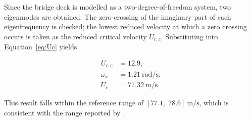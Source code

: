 \documentclass[../main]{subfiles}
\begin{document}
Since the bridge deck is modelled as a two-degree-of-freedom system, two
eigenmodes are obtained. The zero-crossing of the imaginary part of each
eigenfrequency is checked; the lowest reduced velocity at which a zero crossing
occurs is taken as the reduced critical velocity \(U_{r,c}\). Substituting into
Equation~\eqref{eq:Uc} yields

\begin{align*}
    U_{r,c}  &= 12.9, \\
    \omega_r &= 1.21\ \mathrm{rad/s}, \\
    U_c      &= 77.32\ \mathrm{m/s}.
\end{align*}

This result falls within the reference range of \([77.1,\;78.6]\ \mathrm{m/s}\), which is consistent with the range reported by \cite{diana2020}.
\end{document}

